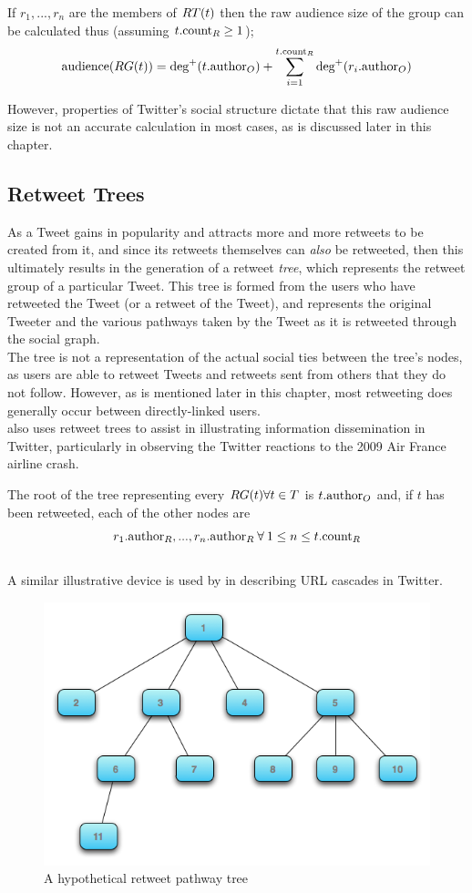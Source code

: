 If $ r_1,...,r_n $ are the members of $RT(t)$ then the raw audience size of the group can be calculated thus (assuming $t.\textrm{count}_R \geq 1$);
\[
	\textrm{audience}(
RG(t)) = \textrm{deg}^+(t.\textrm{author}_O) + \sum\limits_{i=1}^{t.\textrm{count}_R} \textrm{deg}^+(r_i.\textrm{author}_O)
\]

However, properties of Twitter's social structure dictate that this raw audience size is not an accurate calculation in most cases, as is discussed later in this chapter.


\subsection{Retweet Trees}
As a Tweet gains in popularity and attracts more and more retweets to be created from it, and since its retweets themselves can \textit{also} be retweeted, then this ultimately results in the generation of a retweet \textit{tree}, which represents the retweet group of a particular Tweet. This tree is formed from the users who have retweeted the Tweet (or a retweet of the Tweet), and represents the original Tweeter and the various pathways taken by the Tweet as it is retweeted through the social graph.\\
The tree is not a representation of the actual social ties between the tree's nodes, as users are able to retweet Tweets and retweets sent from others that they do not follow. However, as is mentioned later in this chapter, most retweeting does generally occur between directly-linked users.\\
\cite{kwak10} also uses retweet trees to assist in illustrating information dissemination in Twitter, particularly in observing the Twitter reactions to the 2009 Air France airline crash.

The root of the tree representing every $RG(t) \forall t \in T$ is $t.\textrm{author}_O$ and, if $t$ has been retweeted, each of the other nodes are $$r_1.\textrm{author}_R, ... , r_n.\textrm{author}_R \: \forall \: 1 \leq n \leq t.\textrm{count}_R $$\\
A similar illustrative device is used by \cite{galuba10} in describing URL cascades in Twitter.

\begin{figure}[h]
\centering
\includegraphics[scale=0.5]{3.Chapter1/Media/tree.png} 
\caption{A hypothetical retweet pathway tree}
\label{fig:retweet_tree}
\end{figure}

